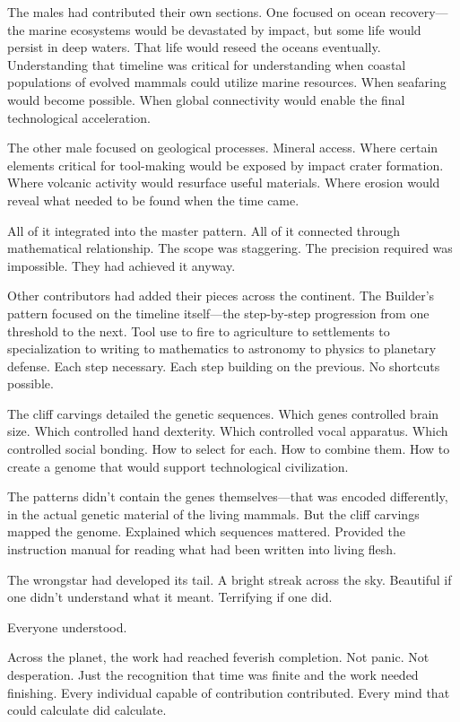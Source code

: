 The males had contributed their own sections. One focused on ocean recovery—the marine ecosystems would be devastated by impact, but some life would persist in deep waters. That life would reseed the oceans eventually. Understanding that timeline was critical for understanding when coastal populations of evolved mammals could utilize marine resources. When seafaring would become possible. When global connectivity would enable the final technological acceleration.

The other male focused on geological processes. Mineral access. Where certain elements critical for tool-making would be exposed by impact crater formation. Where volcanic activity would resurface useful materials. Where erosion would reveal what needed to be found when the time came.

All of it integrated into the master pattern. All of it connected through mathematical relationship. The scope was staggering. The precision required was impossible. They had achieved it anyway.

Other contributors had added their pieces across the continent. The Builder's pattern focused on the timeline itself—the step-by-step progression from one threshold to the next. Tool use to fire to agriculture to settlements to specialization to writing to mathematics to astronomy to physics to planetary defense. Each step necessary. Each step building on the previous. No shortcuts possible.

The cliff carvings detailed the genetic sequences. Which genes controlled brain size. Which controlled hand dexterity. Which controlled vocal apparatus. Which controlled social bonding. How to select for each. How to combine them. How to create a genome that would support technological civilization.

The patterns didn't contain the genes themselves—that was encoded differently, in the actual genetic material of the living mammals. But the cliff carvings mapped the genome. Explained which sequences mattered. Provided the instruction manual for reading what had been written into living flesh.

\scenebreak

The wrongstar had developed its tail. A bright streak across the sky. Beautiful if one didn't understand what it meant. Terrifying if one did.

Everyone understood.

Across the planet, the work had reached feverish completion. Not panic. Not desperation. Just the recognition that time was finite and the work needed finishing. Every individual capable of contribution contributed. Every mind that could calculate did calculate.

